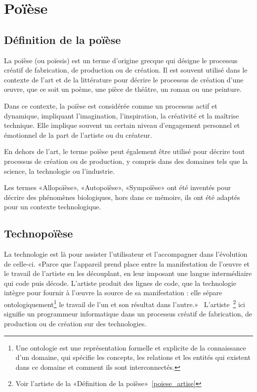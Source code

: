 \section{Poïèse}

\subsection{Définition de la poïèse}

La poïèse (ou poïesis) est un terme d'origine grecque qui désigne le processus créatif de fabrication, de production ou de création. Il est souvent utilisé dans le contexte de l'art et de la littérature pour décrire le processus de création d'une œuvre, que ce soit un poème, une pièce de théâtre, un roman ou une peinture.

Dans ce contexte, la poïèse est considérée comme un processus actif et dynamique, impliquant l'imagination, l'inspiration, la créativité et la maîtrise technique. Elle implique souvent un certain niveau d'engagement personnel et émotionnel de la part de l'artiste\label{poiese_artise} ou du créateur.

En dehors de l'art, le terme poïèse peut également être utilisé pour décrire tout processus de création ou de production, y compris dans des domaines tels que la science, la technologie ou l'industrie.

Les termes «Allopoïèse», «Autopoïèse», «Sympoïèse» ont été inventés pour décrire des phénomènes biologiques, hors dans ce mémoire, ils ont été adaptés pour un contexte technologique.

\subsection{Technopoïèse}



La technologie est là pour assister l'utilisateur et l'accompagner dans l'évolution de celle-ci. «Parce que l’appareil prend place entre la manifestation de l’œuvre et le travail de l’artiste en les découplant, en leur imposant une langue intermédiaire qui code puis décode. L’artiste produit des lignes de code, que la technologie intègre pour fournir à l’œuvre la source de sa manifestation : elle sépare ontologiquement\footnote{Une ontologie est une représentation formelle et explicite de la connaissance d'un domaine, qui spécifie les concepts, les relations et les entités qui existent dans ce domaine et comment ils sont interconnectés.} le travail de l’un et son résultat dans l’autre.»~\cite{artiste_techno_conf_2012} L'artiste~\footnote{Voir l'artiste de la «Définition de la poïèse»~\ref{poiese_artise}} ici signifie un programmeur informatique dans un processus créatif de fabrication, de production ou de création sur des technologies.

